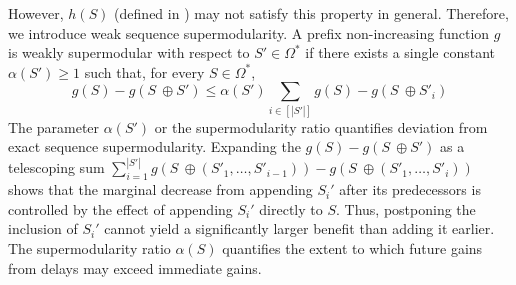 \documentclass{article}
\newcommand{\edit}[1]{{\color{red}#1}}
\begin{document}
However, $h(S)$ (defined in ) may not satisfy this property in general. Therefore, we introduce weak sequence supermodularity. A prefix non-increasing function $g$ is weakly supermodular with respect to $S' \in \Omega^*$ if there exists \edit{a single constant} $\alpha(S') \geq 1$ such that\edit{, for every $S \in \Omega^{*}$,}
\begin{equation}\label{eqn:alpha_supermod}
     g(S) - g(S\ \oplus S') \leq \alpha(S') \sum_{i \in [|S'|]} g(S) - g(S \ \oplus S'_i)
\end{equation}
The parameter $\alpha(S')$ or the supermodularity ratio quantifies deviation from exact sequence supermodularity.
Expanding the $g(S) - g(S\ \oplus S')$ as a telescoping sum 
$\sum_{i = 1}^{|S'|} g(S \ \oplus \left(S'_1, \dots, S'_{i - 1}\right)) - g(S \ \oplus \left(S'_1, \dots, S'_{i}\right))$
shows that the marginal decrease from appending $S_i'$ after its predecessors
is controlled by the effect of appending $S_i'$ directly to $S$. Thus, postponing the inclusion of $S_i'$ cannot yield a significantly larger benefit than adding it earlier. The supermodularity ratio $\alpha(S)$ quantifies the extent to which future gains from delays may exceed immediate gains. 
\end{document}
